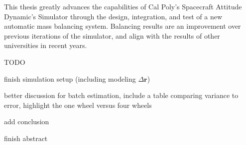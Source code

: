 This thesis greatly advances the capabilities of Cal Poly's 
Spacecraft Attitude Dynamic's Simulator through the design,
integration, and test of a new automatic mass balancing system.
Balancing results are  an improvement over previous iterations 
of the simulator, and align with the results of other universities
in recent years.

TODO

finish simulation setup (including modeling $\Delta\bm{r}$)

better discussion for batch estimation, include a table comparing variance to error, highlight the one wheel versus four wheels

add conclusion

finish abstract